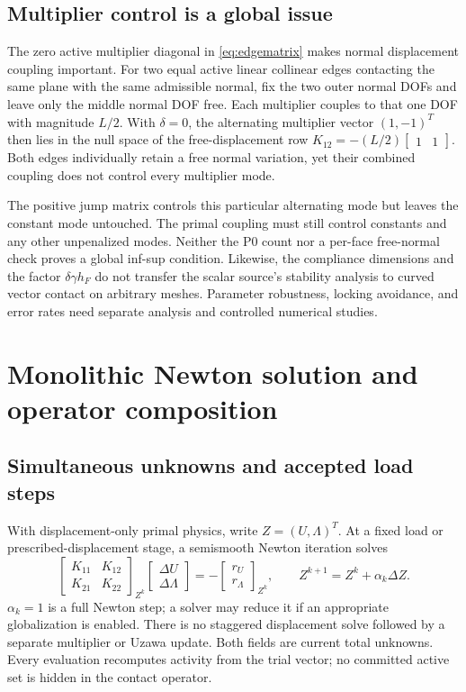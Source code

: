 \documentclass[preprint,11pt]{elsarticle}
\numberwithin{equation}{section}
\begin{document}
\subsection{Multiplier control is a global issue}
The zero active multiplier diagonal in \eqref{eq:edgematrix} makes
normal displacement coupling important. For two equal active linear
collinear edges contacting the same plane with the same admissible normal,
fix the two outer normal DOFs and leave
only the middle normal DOF free. Each multiplier couples to that one
DOF with magnitude $L/2$. With $\delta=0$, the alternating multiplier
vector $(1,-1)^T$ then lies in the null space of the free-displacement
row $K_{12}=-(L/2)\begin{bmatrix}1&1\end{bmatrix}$.
Both edges individually retain a free normal variation, yet their
combined coupling does not control every multiplier mode.

The positive jump matrix controls this particular alternating mode but
leaves the constant mode untouched. The primal coupling must still control
constants and any other unpenalized modes. Neither the P0 count nor a
per-face free-normal check proves a global inf-sup condition. Likewise,
the compliance dimensions and the factor $\delta\gamma h_F$ do not
transfer the scalar source's stability analysis to curved vector contact
on arbitrary meshes. Parameter robustness, locking avoidance, and error
rates need separate analysis and controlled numerical studies.

\section{Monolithic Newton solution and operator composition}
\label{sec:solver}

\subsection{Simultaneous unknowns and accepted load steps}
With displacement-only primal physics, write $Z=(U,\Lambda)^T$.
At a fixed load or prescribed-displacement stage, a semismooth Newton
iteration solves
\begin{equation}
 \begin{bmatrix}K_{11}&K_{12}\\K_{21}&K_{22}\end{bmatrix}_{Z^k}
 \begin{bmatrix}\Delta U\\\Delta\Lambda\end{bmatrix}
 =-\begin{bmatrix}r_U\\r_\Lambda\end{bmatrix}_{Z^k},\qquad
 Z^{k+1}=Z^k+\alpha_k\Delta Z.
 \label{eq:newton}
\end{equation}
$\alpha_k=1$ is a full Newton step; a solver may reduce it if an
appropriate globalization is enabled. There is no staggered
displacement solve followed by a separate multiplier or Uzawa update.
Both fields are current total unknowns. Every evaluation recomputes
activity from the trial vector; no committed active set is hidden in
the contact operator.
\end{document}
